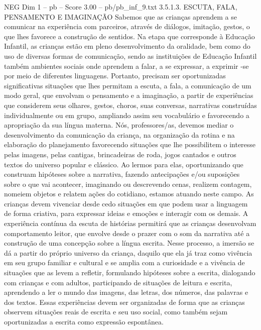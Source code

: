 \begin{textsample}{NEG Dim 1 – pb – Score 3.00 – pb/pb\_inf\_9.txt}  \label{ex:f1_neg_150}
3.5.1.3.
ESCUTA, FALA, PENSAMENTO E IMAGINAÇÃO Sabemos que as crianças aprendem a se comunicar na experiência com parceiros, através de diálogos, imitação, gestos, o que lhes favorece a construção de sentidos.
Na etapa que corresponde à Educação Infantil, as crianças estão em pleno desenvolvimento da oralidade, bem como do uso de diversas formas de comunicação, sendo as instituições de Educação Infantil também ambientes sociais onde aprendem a falar, a se expressar, a exprimir -se por meio de diferentes linguagens.
Portanto, precisam ser oportunizadas significativas situações que lhes permitam a escuta, a fala, a comunicação de um modo geral, que envolvam o pensamento e a imaginação, a partir de experiências que considerem seus olhares, gestos, choros, suas conversas, narrativas construídas individualmente ou em grupo, ampliando assim seu vocabulário e favorecendo a apropriação da sua língua materna.
Nós, professores/as, devemos mediar o desenvolvimento da comunicação da criança, na organização da rotina e na elaboração do planejamento favorecendo situações que lhe possibilitem o interesse pelas imagens, pelas cantigas, brincadeiras de roda, jogos cantados e outros textos do universo popular e clássico.
Ao lermos para elas, oportunizando que construam hipóteses sobre a narrativa, fazendo antecipações e/ou suposições sobre o que vai acontecer, imaginando ou descrevendo cenas, realizem contagem, nomeiem objetos e relatem ações do cotidiano, estamos atuando neste campo.
As crianças devem vivenciar desde cedo situações em que podem usar a linguagem de forma criativa, para expressar ideias e emoções e interagir com os demais.
A experiência contínua da escuta de histórias permitirá que as crianças desenvolvam comportamento leitor, que envolve desde o prazer com o som da narrativa até a construção de uma concepção sobre a língua escrita.
Nesse processo, a imersão se dá a partir do próprio universo da criança, daquilo que ela já traz como vivência em seu grupo familiar e cultural e se amplia com a curiosidade e a vivência de situações que as levem a refletir, formulando hipóteses sobre a escrita, dialogando com crianças e com adultos, participando de situações de leitura e escrita, aprendendo a ler o mundo das imagens, das letras, dos números, das palavras e dos textos.
Essas experiências devem ser organizadas de forma que as crianças observem situações reais de escrita e seu uso social, como também sejam oportunizadas a escrita como expressão espontânea.

\end{textsample}
